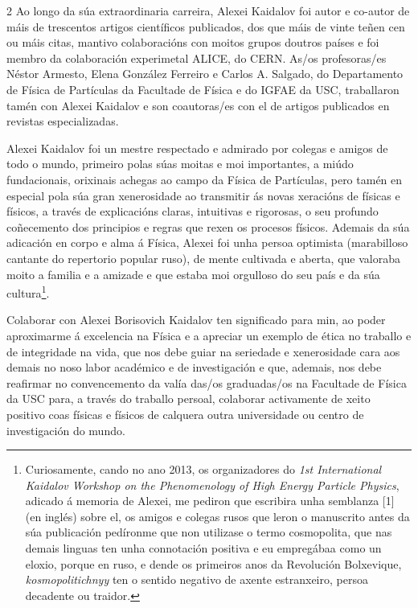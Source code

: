 \begin{refsection}
\begin{multicols}{2}
Ao longo da súa extraordinaria carreira, Alexei Kaidalov foi autor e co-autor
de máis de trescentos artigos científicos publicados, dos que máis de vinte
teñen cen ou máis citas, mantivo colaboracións con moitos grupos doutros países
e foi membro da colaboración experimetal ALICE, do CERN. As/os profesoras/es
Néstor Armesto, Elena González Ferreiro e Carlos A. Salgado, do Departamento de
Física de Partículas da Facultade de Física e do IGFAE da USC, traballaron
tamén con Alexei Kaidalov e son coautoras/es con el de artigos publicados en
revistas especializadas.

Alexei Kaidalov foi un mestre respectado e admirado por colegas e amigos de
todo o mundo, primeiro polas súas moitas e moi importantes, a miúdo
fundacionais, orixinais achegas ao campo da Física de Partículas, pero tamén en
especial pola súa gran xenerosidade ao transmitir ás novas xeracións de físicas
e físicos, a través de explicacións claras, intuitivas e rigorosas, o seu
profundo coñecemento dos principios e regras que rexen os procesos físicos.
Ademais da súa adicación en corpo e alma á Física, Alexei foi unha persoa
optimista (marabilloso cantante do repertorio popular ruso), de mente cultivada
e aberta, que valoraba moito a familia e a amizade e que estaba moi orgulloso
do seu país e da súa cultura\footnote[1]{Curiosamente, cando no ano 2013, os
organizadores do \textit{1st International Kaidalov Workshop on the
Phenomenology of High Energy Particle Physics}, adicado á memoria de Alexei, me
pediron que escribira unha semblanza [1] (en inglés) sobre el, os amigos e
colegas rusos que leron o manuscrito antes da súa publicación pedíronme que non
utilizase o termo cosmopolita, que nas demais linguas ten unha connotación
positiva e eu empregábaa como un eloxio, porque en ruso, e dende os primeiros
anos da Revolución Bolxevique, \textit{kosmopolitichnyy} ten o sentido negativo
de axente estranxeiro, persoa decadente ou traidor.}.

Colaborar con Alexei Borisovich Kaidalov ten significado para min, ao poder
aproximarme á excelencia na Física e a apreciar un exemplo de ética no traballo
e de integridade na vida, que nos debe guiar na seriedade e xenerosidade cara
aos demais no noso labor académico e de investigación e que, ademais, nos debe
reafirmar no convencemento da valía das/os graduadas/os na Facultade de Física
da USC para, a través do traballo persoal, colaborar activamente de xeito
positivo coas físicas e físicos de calquera outra universidade ou centro de
investigación do mundo.


\end{multicols}
\end{refsection}
